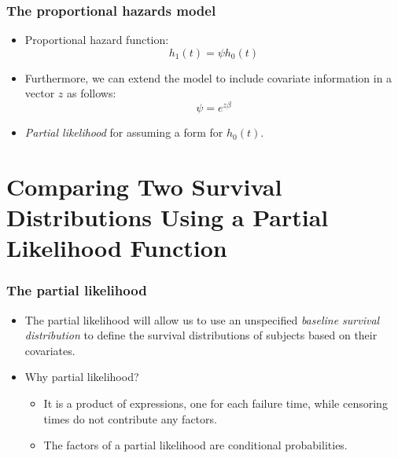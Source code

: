 \documentclass{beamer}
\newcommand{\empr}[1]{{\emph{\color{red}#1}}}
\begin{document}
\pagebreak
\begin{frame}
\frametitle{The proportional hazards model}
\begin{itemize}
\item Proportional hazard function: 
\begin{equation}
h_1(t)={\psi}h_0(t)
\end{equation}
\item Furthermore, we can extend the model to include {\color{red}covariate} information in a vector $z$ as follows:
\begin{equation}
{\psi}=e^{z\beta}
\end{equation}
\item \empr{Partial likelihood} for assuming a form for $h_0(t)$.
\end{itemize}
\end{frame}

\section{Comparing Two Survival Distributions Using a Partial Likelihood Function}
\begin{frame}
\frametitle{The partial likelihood}
\begin{itemize}
\item The partial likelihood will allow us to use an unspecified \empr{baseline survival distribution} to define the survival distributions of subjects based on their covariates.
\item Why partial likelihood?
\begin{itemize}
\item It is a product of expressions, one for each failure time, while censoring times do not contribute any factors.
\item The factors of a partial likelihood are {\color{red}conditional probabilities}.
\end{itemize}
\end{itemize}
\end{frame}
\end{document}
